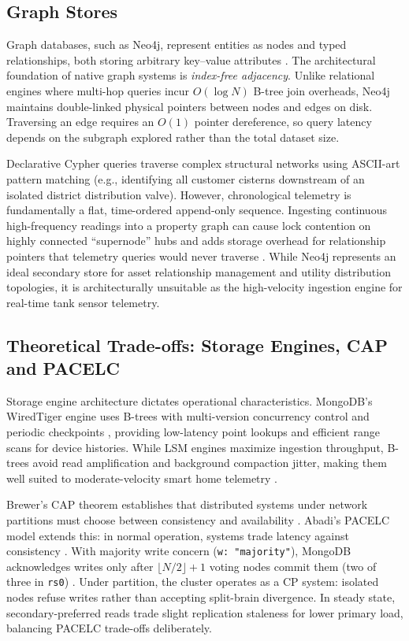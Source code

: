 \documentclass[11pt,a4paper]{article}
\begin{document}
\subsection{Graph Stores}
Graph databases, such as Neo4j, represent entities as nodes and typed relationships, both storing arbitrary key--value attributes \citep{robinson2015}. The architectural foundation of native graph systems is \emph{index-free adjacency}. Unlike relational engines where multi-hop queries incur $O(\log N)$ B-tree join overheads, Neo4j maintains double-linked physical pointers between nodes and edges on disk. Traversing an edge requires an $O(1)$ pointer dereference, so query latency depends on the subgraph explored rather than the total dataset size.

Declarative Cypher queries traverse complex structural networks using ASCII-art pattern matching (e.g., identifying all customer cisterns downstream of an isolated district distribution valve). However, chronological telemetry is fundamentally a flat, time-ordered append-only sequence. Ingesting continuous high-frequency readings into a property graph can cause lock contention on highly connected ``supernode'' hubs and adds storage overhead for relationship pointers that telemetry queries would never traverse \citep{robinson2015}. While Neo4j represents an ideal secondary store for asset relationship management and utility distribution topologies, it is architecturally unsuitable as the high-velocity ingestion engine for real-time tank sensor telemetry.

\subsection{Theoretical Trade-offs: Storage Engines, CAP and PACELC}
Storage engine architecture dictates operational characteristics. MongoDB's WiredTiger engine uses B-trees with multi-version concurrency control and periodic checkpoints \citep{mongoWT}, providing low-latency point lookups and efficient range scans for device histories. While LSM engines maximize ingestion throughput, B-trees avoid read amplification and background compaction jitter, making them well suited to moderate-velocity smart home telemetry \citep{kleppmann2017}.

Brewer's CAP theorem establishes that distributed systems under network partitions must choose between consistency and availability \citep{gilbert2002,brewer2012}. Abadi's PACELC model extends this: in normal operation, systems trade latency against consistency \citep{abadi2012}. With majority write concern (\texttt{w:~"majority"}), MongoDB acknowledges writes only after $\lfloor N/2 \rfloor + 1$ voting nodes commit them (two of three in \texttt{rs0}) \citep{mongoWC}. Under partition, the cluster operates as a CP system: isolated nodes refuse writes rather than accepting split-brain divergence. In steady state, secondary-preferred reads trade slight replication staleness for lower primary load, balancing PACELC trade-offs deliberately.
\end{document}
